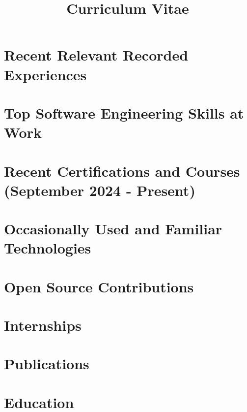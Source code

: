 \documentclass[13.12pt,a4paper,sans,colorlinks,urlcolor=violet, hyperindex,plainpages=false,bookmarksopen,bookmarksnumbered,pdfusetitle]{moderncv}
\title{Curriculum Vitae}
\begin{document}
\hypersetup{urlcolor=violet}

\makecvtitle
\vspace{-3em}



\vspace{-1em}

\section{Recent Relevant Recorded Experiences}


\vspace{0.5em}



\section{Top Software Engineering Skills at \textbf{Work}}



\section{Recent Certifications and Courses (September 2024 - Present)}


\section{Occasionally Used and Familiar Technologies}


\section{Open Source Contributions}


\section{Internships}


\section{Publications}


\section{Education}


\vspace{0.5em}


\end{document}
